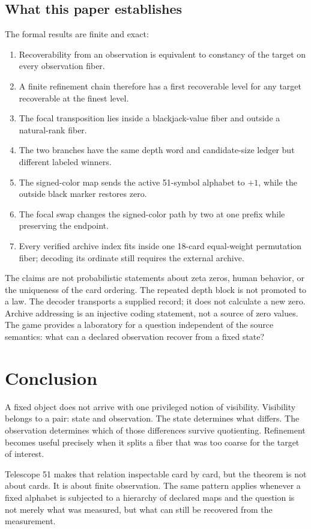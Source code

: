 \documentclass[9pt]{extarticle}
\theoremstyle{cgplain}
\theoremstyle{definition}
\begin{document}
\subsection*{What this paper establishes}
The formal results are finite and exact:
\begin{enumerate}
\item Recoverability from an observation is equivalent to constancy of the target on every observation fiber.
\item A finite refinement chain therefore has a first recoverable level for any target recoverable at the finest level.
\item The focal transposition lies inside a blackjack-value fiber and outside a natural-rank fiber.
\item The two branches have the same depth word and candidate-size ledger but different labeled winners.
\item The signed-color map sends the active 51-symbol alphabet to $+1$, while the outside black marker restores zero.
\item The focal swap changes the signed-color path by two at one prefix while preserving the endpoint.
\item Every verified archive index fits inside one 18-card equal-weight permutation fiber; decoding its ordinate still requires the external archive.
\end{enumerate}

The claims are not probabilistic statements about zeta zeros, human behavior, or the uniqueness of the card ordering. The repeated depth block is not promoted to a law. The decoder transports a supplied record; it does not calculate a new zero. Archive addressing is an injective coding statement, not a source of zero values. The game provides a laboratory for a question independent of the source semantics: what can a declared observation recover from a fixed state?

\newpage
\section*{Conclusion}
A fixed object does not arrive with one privileged notion of visibility. Visibility belongs to a pair: state and observation. The state determines what differs. The observation determines which of those differences survive quotienting. Refinement becomes useful precisely when it splits a fiber that was too coarse for the target of interest.

Telescope 51 makes that relation inspectable card by card, but the theorem is not about cards. It is about finite observation. The same pattern applies whenever a fixed alphabet is subjected to a hierarchy of declared maps and the question is not merely what was measured, but what can still be recovered from the measurement.
\end{document}

